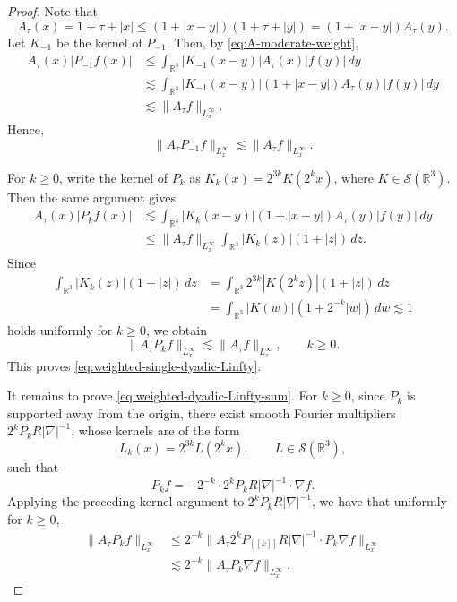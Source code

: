 \documentclass[11pt,twoside]{article}
\def\ls{\lesssim}
\theoremstyle{plain}
\theoremstyle{definition}
\theoremstyle{assumption}
\numberwithin{equation}{section}
\begin{document}
	\begin{proof}
		Note that
		\begin{equation}
			\label{eq:A-moderate-weight}
			A_\tau(x)
			=
			1+\tau+|x|
			\le
			(1+|x-y|)(1+\tau+|y|)
			=
			(1+|x-y|)A_\tau(y).
		\end{equation}
		Let \(K_{-1}\) be the kernel of \(P_{-1}\). Then, by
		\eqref{eq:A-moderate-weight},
		\[
		\begin{aligned}
			A_\tau(x)|P_{-1}f(x)|
			&\le
			\int_{\mathbb R^3}
			|K_{-1}(x-y)|A_\tau(x)|f(y)|\,dy
			\\
			&\ls
			\int_{\mathbb R^3}
			|K_{-1}(x-y)|(1+|x-y|)A_\tau(y)|f(y)|\,dy
			\\
			&\ls
			\|A_\tau f\|_{L^\infty_x}.
		\end{aligned}
		\]
		Hence,
		\[
		\|A_\tau P_{-1}f\|_{L^\infty_x}
		\ls
		\|A_\tau f\|_{L^\infty_x}.
		\]
		
		For \(k\ge0\), write the kernel of \(P_k\) as
		$K_k(x)=2^{3k}K(2^kx)$,
		where \(K\in\mathcal S(\mathbb R^3)\). Then the same argument gives
		\[
		\begin{aligned}
			A_\tau(x)|P_kf(x)|
			&\ls
			\int_{\mathbb R^3}
			|K_k(x-y)|(1+|x-y|)A_\tau(y)|f(y)|\,dy
			\\
			&\le
			\|A_\tau f\|_{L^\infty_x}
			\int_{\mathbb R^3}
			|K_k(z)|(1+|z|)\,dz .
		\end{aligned}
		\]
		Since
		\[
		\begin{aligned}
			\int_{\mathbb R^3}|K_k(z)|(1+|z|)\,dz
			&=
			\int_{\mathbb R^3}
			2^{3k}|K(2^kz)|(1+|z|)\,dz
			\\
			&=
			\int_{\mathbb R^3}
			|K(w)|(1+2^{-k}|w|)\,dw
			\ls 1
		\end{aligned}
		\]
		holds uniformly for \(k\ge0\), we obtain
		\[
		\|A_\tau P_kf\|_{L^\infty_x}
		\ls
		\|A_\tau f\|_{L^\infty_x},
		\qquad k\ge0.
		\]
		This proves \eqref{eq:weighted-single-dyadic-Linfty}.
		
		It remains to prove \eqref{eq:weighted-dyadic-Linfty-sum}.
		For \(k\ge 0 \), since \(P_k\) is supported away from the origin, there
		exist smooth Fourier multipliers $2^{k}P_k R|\nabla|^{-1}$, whose
		kernels are of the form
		\[
		L_{k}(x)=2^{3k}L(2^kx),
		\qquad L\in\mathcal S(\mathbb R^3),
		\]
		such that
		\[
		P_k f
		=
		-2^{-k}\cdot2^{k}P_k R|\nabla|^{-1}\cdot \nabla f .
		\]
		Applying the preceding kernel argument to \(2^{k}P_k R|\nabla|^{-1}\), we have that uniformly for \(k\ge 0\),
		\[
		\begin{aligned}
			\|A_\tau P_k f\|_{L^\infty_x}
			&\le
			2^{-k}
			\|A_\tau 2^{k}P_{[[k]]} R|\nabla|^{-1}\cdot P_k\nabla f\|_{L^\infty_x}
			\\
			&\ls
			2^{-k}
			\|A_\tau P_k\nabla f\|_{L^\infty_x}.
		\end{aligned}
		\]	
		\end{proof}
	
\end{document}
